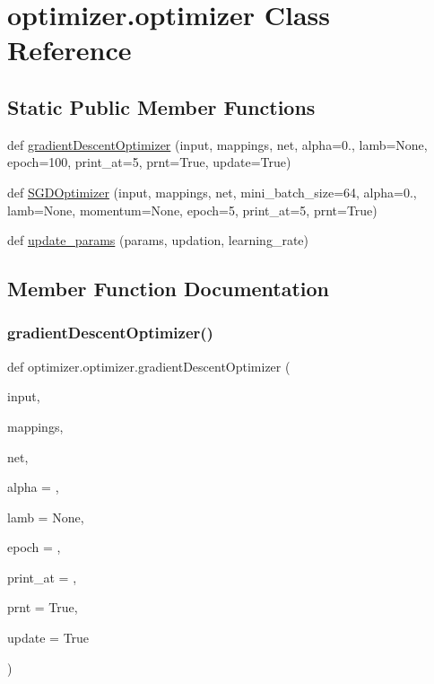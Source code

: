 \hypertarget{classoptimizer_1_1optimizer}{}\section{optimizer.\+optimizer Class Reference}
\label{classoptimizer_1_1optimizer}
\subsection*{Static Public Member Functions}
\begin{DoxyCompactItemize}
\item 
def \hyperlink{classoptimizer_1_1optimizer_adc3ce4d6f25ba68c0f4bd442a54d2155}{gradient\+Descent\+Optimizer} (input, mappings, net, alpha=0., lamb=None, epoch=100, print\+\_\+at=5, prnt=True, update=True)
\item 
def \hyperlink{classoptimizer_1_1optimizer_a9248b4bea24619717271e053d49abc9c}{S\+G\+D\+Optimizer} (input, mappings, net, mini\+\_\+batch\+\_\+size=64, alpha=0., lamb=None, momentum=None, epoch=5, print\+\_\+at=5, prnt=True)
\item 
def \hyperlink{classoptimizer_1_1optimizer_ae54007767b7637fc2a1bfd0bc0a71934}{update\+\_\+params} (params, updation, learning\+\_\+rate)
\end{DoxyCompactItemize}


\subsection{Member Function Documentation}
\mbox{\label{classoptimizer_1_1optimizer_adc3ce4d6f25ba68c0f4bd442a54d2155}} 
\subsubsection{\texorpdfstring{gradient\+Descent\+Optimizer()}{gradientDescentOptimizer()}}
{\footnotesize\ttfamily def optimizer.\+optimizer.\+gradient\+Descent\+Optimizer (\begin{DoxyParamCaption}\item[{}]{input,  }\item[{}]{mappings,  }\item[{}]{net,  }\item[{}]{alpha = {},  }\item[{}]{lamb = {\ttfamily None},  }\item[{}]{epoch = {},  }\item[{}]{print\+\_\+at = {},  }\item[{}]{prnt = {\ttfamily True},  }\item[{}]{update = {\ttfamily True} }\end{DoxyParamCaption})\hspace{0.3cm}{\ttfamily [static]}}

